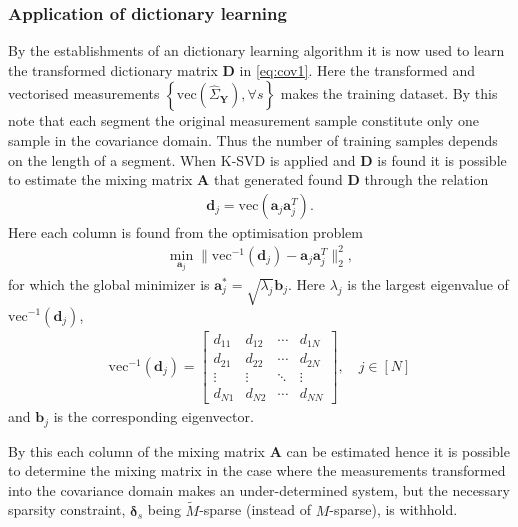 \subsubsection{Application of dictionary learning}
By the establishments of an dictionary learning algorithm it is now used to learn the transformed dictionary matrix $\textbf{D}$ in \eqref{eq:cov1}. Here the transformed and vectorised measurements $\left\{ \text{vec}\left( \hat{\Sigma}_\textbf{Y}\right), \forall s\right\}$ makes the training dataset. By this note that each segment the original measurement sample constitute only one sample in the covariance domain. Thus the number of training samples depends on the length of a segment.     
When K-SVD is applied and $\mathbf{D}$ is found it is possible to estimate the mixing matrix $\mathbf{A}$ that generated found $\textbf{D}$ through the relation 
\begin{align*}
\mathbf{d}_j = \text{vec}(\mathbf{a}_j \mathbf{a}_j^T).
\end{align*}
Here each column is found from the optimisation problem 
\begin{align*}
\min_{\textbf{a}_j} \| \text{vec}^{-1}(\textbf{d}_j) -\textbf{a}_j\textbf{a}_j^T\|_2^2, 
\end{align*}
for which the global minimizer is $\mathbf{a}^{\ast}_j=\sqrt{\lambda_j} \textbf{b}_j$. Here $\lambda_j$ is the largest eigenvalue of $\text{vec}^{-1}(\textbf{d}_j)$,
\begin{align*}
\text{vec}^{-1}(\textbf{d}_j) = 
\begin{bmatrix}
d_{11} & d_{12} & \cdots & d_{1N} \\
d_{21} & d_{22} & \cdots & d_{2N} \\
\vdots & \vdots & \ddots & \vdots \\
d_{N1} & d_{N2} & \cdots & d_{NN}
\end{bmatrix}, \quad j \in [N]
\end{align*}
and $\textbf{b}_j$ is the corresponding eigenvector.

By this each column of the mixing matrix $\textbf{A}$ can be estimated hence it is possible to determine the mixing matrix in the case where the measurements transformed into the covariance domain makes an under-determined system, but the necessary sparsity constraint, $\boldsymbol{\delta}_s$ being $\widetilde{M}$-sparse (instead of $M$-sparse), is withhold.    




